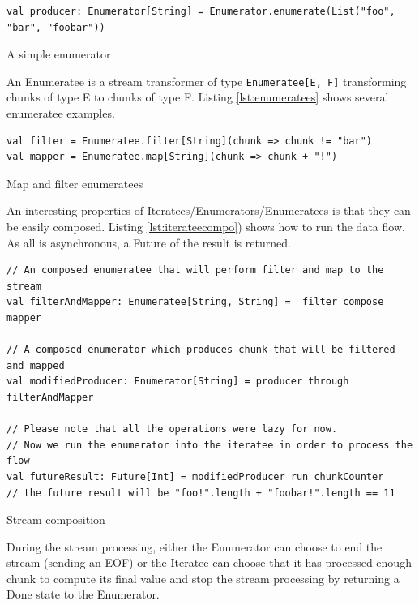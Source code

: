 \begin{listing}[h]
\begin{verbatim}
val producer: Enumerator[String] = Enumerator.enumerate(List("foo", "bar", "foobar"))
\end{verbatim}
\caption{A simple enumerator}
\label{lst:enumerators}
\end{listing}

An Enumeratee is a stream transformer of type \verb|Enumeratee[E, F]| transforming chunks of type E to chunks of type F.
Listing \ref{lst:enumeratees} shows several enumeratee examples.

\begin{listing}[h]
\begin{verbatim}
val filter = Enumeratee.filter[String](chunk => chunk != "bar")
val mapper = Enumeratee.map[String](chunk => chunk + "!")
\end{verbatim}
\caption{Map and filter enumeratees}
\label{lst:enumeratees}
\end{listing}

An interesting properties of Iteratees/Enumerators/Enumeratees is that they can be easily composed. Listing \ref{lst:iterateecompo}) shows how to
run the data flow. As all is asynchronous, a Future of the result is returned. 

\begin{listing}[h]
\begin{verbatim}
// An composed enumeratee that will perform filter and map to the stream
val filterAndMapper: Enumeratee[String, String] =  filter compose mapper

// A composed enumerator which produces chunk that will be filtered and mapped
val modifiedProducer: Enumerator[String] = producer through filterAndMapper

// Please note that all the operations were lazy for now.
// Now we run the enumerator into the iteratee in order to process the flow
val futureResult: Future[Int] = modifiedProducer run chunkCounter
// the future result will be "foo!".length + "foobar!".length == 11
\end{verbatim}
\caption{Stream composition}
\label{lst:iterateecompo}
\end{listing}

During the stream processing, either the Enumerator can choose to end the stream (sending an EOF) or the Iteratee can choose that it has processed enough
chunk to compute its final value and stop the stream processing by returning a Done state to the Enumerator.
\\

